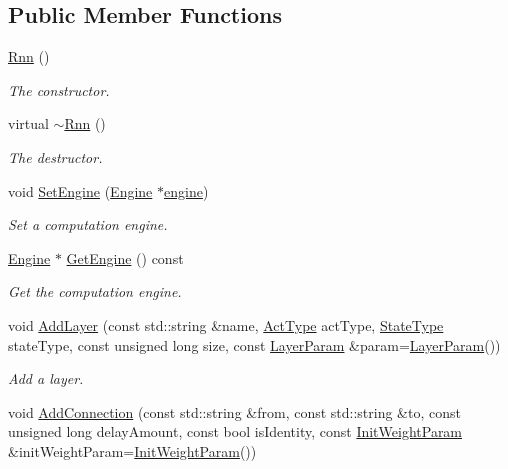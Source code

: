 \subsection*{Public Member Functions}
\begin{DoxyCompactItemize}
\item 
\hyperlink{classfractal_1_1Rnn_a544edffb4b139d116f151647a024f0cc}{Rnn} ()
\begin{DoxyCompactList}\small\item\em The constructor. \end{DoxyCompactList}\item 
virtual \hyperlink{classfractal_1_1Rnn_a7c31fea1e6eecb80d0f3139b2ea12206}{$\sim$\+Rnn} ()
\begin{DoxyCompactList}\small\item\em The destructor. \end{DoxyCompactList}\item 
void \hyperlink{classfractal_1_1Rnn_a81f50740ac51ff686045dbc632029b8b}{Set\+Engine} (\hyperlink{classfractal_1_1Engine}{Engine} $\ast$\hyperlink{classfractal_1_1Rnn_ae1ab28da171d29e77200295cf86e85f7}{engine})
\begin{DoxyCompactList}\small\item\em Set a computation engine. \end{DoxyCompactList}\item 
\hyperlink{classfractal_1_1Engine}{Engine} $\ast$ \hyperlink{classfractal_1_1Rnn_a8bdfcdaeda6fbd1b02ab77f720140e65}{Get\+Engine} () const 
\begin{DoxyCompactList}\small\item\em Get the computation engine. \end{DoxyCompactList}\item 
void \hyperlink{classfractal_1_1Rnn_acd58e1c848aaa729566ab15fe53f0a11}{Add\+Layer} (const std\+::string \&name, \hyperlink{namespacefractal_a6b4f3887f3de57d4b1cbb00d198833ec}{Act\+Type} act\+Type, \hyperlink{namespacefractal_a17646dafc0f3fc262f238822cca09f2e}{State\+Type} state\+Type, const unsigned long size, const \hyperlink{classfractal_1_1LayerParam}{Layer\+Param} \&param=\hyperlink{classfractal_1_1LayerParam}{Layer\+Param}())
\begin{DoxyCompactList}\small\item\em Add a layer. \end{DoxyCompactList}\item 
void \hyperlink{classfractal_1_1Rnn_a2d5b53ec397838bd9fa7f1d1e3dd1ea9}{Add\+Connection} (const std\+::string \&from, const std\+::string \&to, const unsigned long delay\+Amount, const bool is\+Identity, const \hyperlink{classfractal_1_1InitWeightParam}{Init\+Weight\+Param} \&init\+Weight\+Param=\hyperlink{classfractal_1_1InitWeightParam}{Init\+Weight\+Param}())

\end{DoxyCompactItemize}
